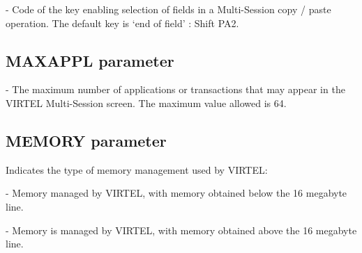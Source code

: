 \documentclass[letterpaper,10pt,english]{sphinxmanual}
\begin{document}
 - Code of the key enabling selection of fields in a Multi-Session copy / paste operation. The default key is ‘end of field’ : Shift PA2.

\ignorespaces 

\subsection{MAXAPPL parameter}
\label{\detokenize{Installation_Guide:maxappl-parameter}}\label{\detokenize{Installation_Guide:index-89}}
\begin{sphinxVerbatim}[commandchars=\\\{\}]
                            
\end{sphinxVerbatim}

 - The maximum number of applications or transactions that may appear in the VIRTEL Multi-Session screen. The maximum value allowed is 64.

\ignorespaces 

\subsection{MEMORY parameter}
\label{\detokenize{Installation_Guide:memory-parameter}}\label{\detokenize{Installation_Guide:index-90}}
\begin{sphinxVerbatim}[commandchars=\\\{\}]
\PYG{p}{[}\PYG{p}{]} 
\end{sphinxVerbatim}

Indicates the type of memory management used by VIRTEL:

 - Memory managed by VIRTEL, with memory obtained below the 16 megabyte line.

 - Memory is managed by VIRTEL, with memory obtained above the 16 megabyte line.
\end{document}

